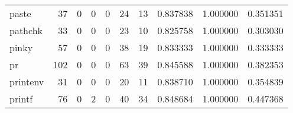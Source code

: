\begin{longtable}{lrrrrrrrrr}
paste     &                                        37 &                                                  0 &                                                  0 &                                                  0 &                                                 24 &                                                 13 &                                           0.837838 &                               1.000000 &                             0.351351 \\
pathchk   &                                        33 &                                                  0 &                                                  0 &                                                  0 &                                                 23 &                                                 10 &                                           0.825758 &                               1.000000 &                             0.303030 \\
pinky     &                                        57 &                                                  0 &                                                  0 &                                                  0 &                                                 38 &                                                 19 &                                           0.833333 &                               1.000000 &                             0.333333 \\
pr        &                                       102 &                                                  0 &                                                  0 &                                                  0 &                                                 63 &                                                 39 &                                           0.845588 &                               1.000000 &                             0.382353 \\
printenv  &                                        31 &                                                  0 &                                                  0 &                                                  0 &                                                 20 &                                                 11 &                                           0.838710 &                               1.000000 &                             0.354839 \\
printf    &                                        76 &                                                  0 &                                                  2 &                                                  0 &                                                 40 &                                                 34 &                                           0.848684 &                               1.000000 &                             0.447368 \\

\end{longtable}
